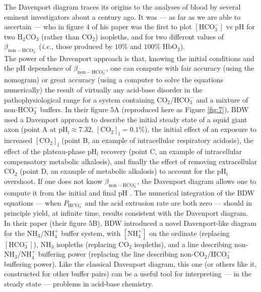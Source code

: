\documentclass[fleqn,10pt]{physiome}
\begin{document}
The Davenport diagram traces its origins to the analyses of blood by several eminent investigators about a century ago. It was \cite{henderson1921blood} --- as far as we are able to ascertain --- who in figure $4$ of his paper was the first to plot $\mathrm{[HCO_3^-]}$ vs $\mathrm{pH}$ for two $\mathrm{H_2CO_3}$ (rather than $\mathrm{CO_2}$) isopleths, and for two different values of $\beta_\mathrm{non-HCO_3^-}$ (\emph{i.e.}, those produced by $10\%$ and $100\%$ $\mathrm{HbO_2}$).\\

The power of the Davenport approach is that, knowing the initial conditions and the $\mathrm{pH}$ dependence of $\beta_\mathrm{non-HCO_3^-}$, one can compute with fair accuracy (using the nomogram) or great accuracy (using a computer to solve the equations numerically) the result of virtually any acid-base disorder in the pathophysiological range for a system containing $\mathrm{CO_2}$/$\mathrm{HCO_3^-}$ and a mixture of non-$\mathrm{HCO_3^-}$ buffers. In their figure $5$A (reproduced here as Figure \ref{fig:7}), BDW used a Davenport approach to describe the initial steady state of a squid giant axon (point A at $\mathrm{pH_i} \approx7.32$, $\mathrm{[CO_2]_i} = 0.1\%$), the initial effect of an exposure to increased $\mathrm{[CO_2]_i}$ (point B, an example of intracellular respiratory acidosis), the effect of the plateau-phase $\mathrm{pH_i}$ recovery (point C, an example of intracellular compensatory metabolic alkalosis), and finally the effect of removing extracellular $\mathrm{CO_2}$ (point D, an example of metabolic alkalosis) to account for the $\mathrm{pH_i}$  overshoot. If one does not know $\beta_\mathrm{non-HCO_3^-}$, the Davenport diagram allows one to compute it from the initial and final $\mathrm{pH}$ . The numerical integration of the BDW equations --- when $P_\mathrm{HCO_3^-}$ and the acid extrusion rate are both zero --- should in principle yield, at infinite time, results consistent with the Davenport diagram.\\

In their paper (their figure $5$B), BDW introduced a novel Davenport-like diagram for the $\mathrm{NH_3}$/$\mathrm{NH_4^+}$ buffer system, with $\mathrm{[NH_4^+]}$ on the ordinate (replacing $\mathrm{[HCO_3^-]}$), $\mathrm{NH_3}$ isopleths (replacing $\mathrm{CO_2}$ isopleths), and a line describing non-$\mathrm{NH_3}$/$\mathrm{NH_4^+}$ buffering power (replacing the line describing non-$\mathrm{CO_2}$/$\mathrm{HCO_3^-}$ buffering power). Like the classical Davenport diagram, this one (or others like it, constructed for other buffer pairs) can be a useful tool for interpreting --- in the steady state --- problems in acid-base chemistry.\\
\end{document}

